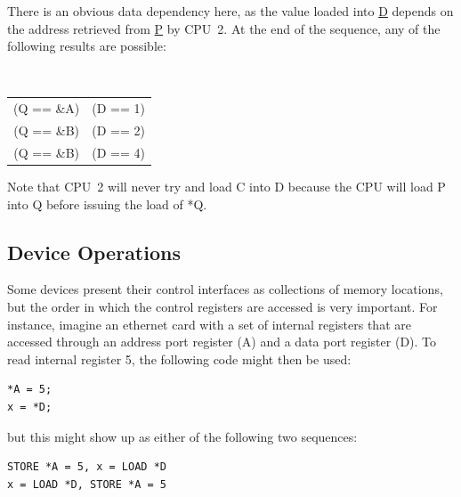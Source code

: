 There is an obvious data dependency here,
as the value loaded into \url{D} depends on
the address retrieved from \url{P} by CPU~2.
At the end of the sequence, any of the
following results are possible:

\vspace{5pt}
\begin{minipage}[t]{\columnwidth}
\tt
\begin{tabular}{c@{ and }c}
	(Q == \&A) & (D == 1) \\
	(Q == \&B) & (D == 2) \\
	(Q == \&B) & (D == 4) \\
\end{tabular}
\end{minipage}
\vspace{5pt}

Note that CPU~2 will never try and load C into D because the CPU will load P
into Q before issuing the load of *Q.

\subsection{Device Operations}
\label{sec:advsync:Device Operations}

Some devices present their control interfaces as collections of memory
locations, but the order in which the control registers are accessed is very
important.  For instance, imagine an ethernet card with a set of internal
registers that are accessed through an address port register (A) and a data
port register (D).  To read internal register 5, the following code might then
be used:

\vspace{5pt}
\begin{minipage}[t]{\columnwidth}
\small
\begin{verbatim}
*A = 5;
x = *D;
\end{verbatim}
\end{minipage}
\vspace{5pt}

but this might show up as either of the following two sequences:

\vspace{5pt}
\begin{minipage}[t]{\columnwidth}
\small
\begin{verbatim}
STORE *A = 5, x = LOAD *D
x = LOAD *D, STORE *A = 5
\end{verbatim}
\end{minipage}
\vspace{5pt}

